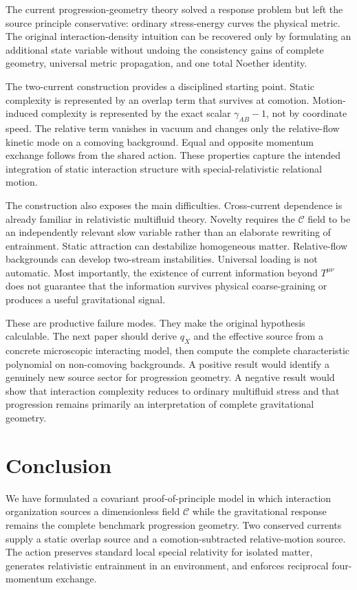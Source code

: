 \documentclass[11pt]{article}
\begin{document}
The current progression-geometry theory solved a response problem but left the source principle conservative: ordinary stress-energy curves the physical metric.  The original interaction-density intuition can be recovered only by formulating an additional state variable without undoing the consistency gains of complete geometry, universal metric propagation, and one total Noether identity.

The two-current construction provides a disciplined starting point.  Static complexity is represented by an overlap term that survives at comotion.  Motion-induced complexity is represented by the exact scalar $\gamma_{AB}-1$, not by coordinate speed.  The relative term vanishes in vacuum and changes only the relative-flow kinetic mode on a comoving background.  Equal and opposite momentum exchange follows from the shared action.  These properties capture the intended integration of static interaction structure with special-relativistic relational motion.

The construction also exposes the main difficulties.  Cross-current dependence is already familiar in relativistic multifluid theory.  Novelty requires the $\mathcal C$ field to be an independently relevant slow variable rather than an elaborate rewriting of entrainment.  Static attraction can destabilize homogeneous matter.  Relative-flow backgrounds can develop two-stream instabilities.  Universal loading is not automatic.  Most importantly, the existence of current information beyond $T^{\mu\nu}$ does not guarantee that the information survives physical coarse-graining or produces a useful gravitational signal.

These are productive failure modes.  They make the original hypothesis calculable.  The next paper should derive $q_X$ and the effective source from a concrete microscopic interacting model, then compute the complete characteristic polynomial on non-comoving backgrounds.  A positive result would identify a genuinely new source sector for progression geometry.  A negative result would show that interaction complexity reduces to ordinary multifluid stress and that progression remains primarily an interpretation of complete gravitational geometry.

\section{Conclusion}

We have formulated a covariant proof-of-principle model in which interaction organization sources a dimensionless field $\mathcal C$ while the gravitational response remains the complete benchmark progression geometry.  Two conserved currents supply a static overlap source and a comotion-subtracted relative-motion source.  The action preserves standard local special relativity for isolated matter, generates relativistic entrainment in an environment, and enforces reciprocal four-momentum exchange.
\end{document}
